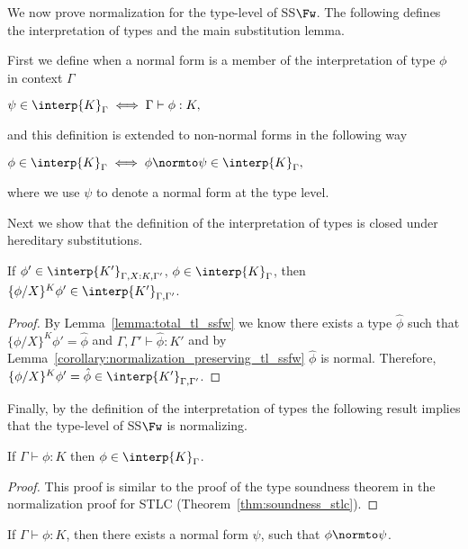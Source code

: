 We now prove normalization for the type-level of SS$\Fw$.  The
following defines the interpretation of types and the main
substitution lemma.

\begin{definition}
  \label{def:interpretation_of_types_ssfw}
  First we define when a normal form is a member of the interpretation of type $\phi$ in context $\Gamma$
  \begin{center}
    \begin{math}
      \psi \in \interp{K}_\Gamma \iff \Gamma \vdash \phi:K,
  \end{math}
  \end{center}
  and this definition is extended to non-normal forms in the following way
  \begin{center}
    \begin{math}
      \phi \in \interp{K}_\Gamma \iff \phi \normto \psi \in \interp{K}_\Gamma,
  \end{math}
  \end{center}
 where we use $\psi$ to denote a normal form at the type level.
\end{definition}

\noindent 
Next we show that the definition of the interpretation of types is closed under
hereditary substitutions.  

\begin{lemma}
  If $\phi' \in \interp{K'}_{\Gamma,X:K,\Gamma'}$, $\phi \in \interp{K}_\Gamma$, then 
  $\{\phi/X\}^K \phi' \in \interp{K'}_{\Gamma,\Gamma'}$.
  
  \label{lemma:interpretation_of_types_closed_substitution_ssfw}
\end{lemma}
\begin{proof}
  By Lemma~\ref{lemma:total_tl_ssfw} we know there exists a type $\hat{\phi}$ 
  such that $\{\phi/X\}^K \phi' = \hat{\phi}$ and $\Gamma,\Gamma' \vdash \hat{\phi}:K'$ and by 
  Lemma~\ref{corollary:normalization_preserving_tl_ssfw} $\hat{\phi}$ is normal.  Therefore,
  $\{\phi/X\}^K \phi' = \hat{\phi} \in \interp{K'}_{\Gamma,\Gamma'}$.
\end{proof}
\noindent
Finally, by the definition of the interpretation of types the following result implies that the type-level
of SS$\Fw$ is normalizing.
\begin{thm}
  If $\Gamma \vdash \phi:K$ then $\phi \in \interp{K}_\Gamma$.
  \label{thm:soundness_ssfw}
\end{thm}
\begin{proof}
  This proof is similar to the proof of the type soundness theorem in
  the normalization proof for STLC (Theorem~\ref{thm:soundness_stlc}).
\end{proof}
\begin{corollary}
  \label{coro:normalization_type_level_ssfw}
  If $\Gamma \vdash \phi:K$, then there exists a normal form $\psi$,
  such that $\phi \normto \psi$.
\end{corollary}

